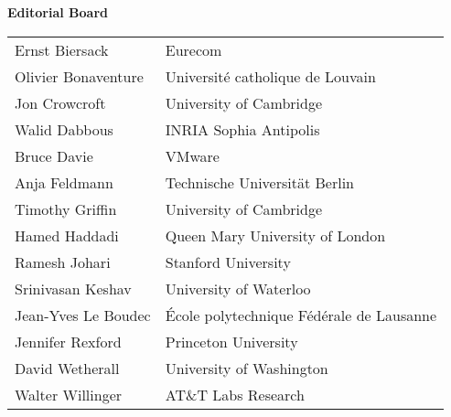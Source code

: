 
%





\begin{center}
{\Huge \textbf{Editorial Board}}


\Large 
\vspace{1in}
\begin{tabular}{ll}
Ernst Biersack &	Eurecom \\
Olivier Bonaventure &	Universit\'{e} catholique de Louvain \\
Jon Crowcroft	&  University of Cambridge \\
Walid Dabbous	  & INRIA Sophia Antipolis \\
Bruce Davie	& VMware \\
Anja Feldmann	& Technische Universit\"{a}t Berlin\\
Timothy Griffin	& University of Cambridge \\
Hamed Haddadi &	Queen Mary University of London\\
Ramesh Johari	 & Stanford University\\
Srinivasan Keshav &	University of Waterloo\\
Jean-Yves Le Boudec	& \'{E}cole polytechnique F\'{e}d\'{e}rale de Lausanne\\
Jennifer Rexford &	Princeton University\\
David Wetherall	& University of Washington\\
Walter Willinger	& AT\&T Labs Research\\
\end{tabular}
\end{center}


\newpage



